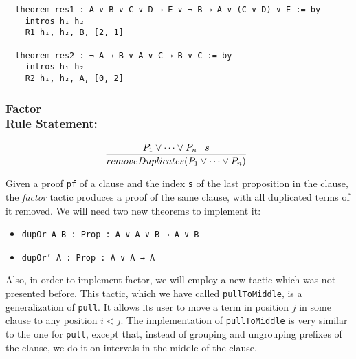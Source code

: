 \begin{verbatim}
  theorem res1 : A ∨ B ∨ C ∨ D → E ∨ ¬ B → A ∨ (C ∨ D) ∨ E := by
    intros h₁ h₂
    R1 h₁, h₂, B, [2, 1]

  theorem res2 : ¬ A → B ∨ A ∨ C → B ∨ C := by
    intros h₁ h₂
    R2 h₁, h₂, A, [0, 2]
\end{verbatim}

\subsubsection*{Factor\\Rule Statement:}
\[
  \infer[]{removeDuplicates(P_{1} \vee \cdots \vee P_{n})}{P_{1} \vee \cdots \vee P_{n} \mid s}
\]

Given a proof \texttt{pf} of a clause and the index \texttt{s} of the last proposition in the clause,
the \textit{factor} tactic produces a proof of the same clause, with all duplicated terms of it removed. We
will need two new theorems to implement it:

\begin{itemize}
  \item \texttt{dupOr {A B : Prop} : A ∨ A ∨ B → A ∨ B}
  \item \texttt{dupOr' {A : Prop} : A ∨ A → A}
\end{itemize}

Also, in order to implement factor, we will employ a new tactic which was not presented before.
This tactic, which we have called \texttt{pullToMiddle},
is a generalization of \texttt{pull}. It allows its user to move a term in position $j$ in some clause to any position
$i < j$. The implementation of \texttt{pullToMiddle} is very similar to the one for \texttt{pull}, except
that, instead of grouping and ungrouping prefixes of the clause, we do it on intervals in the middle of the clause.

